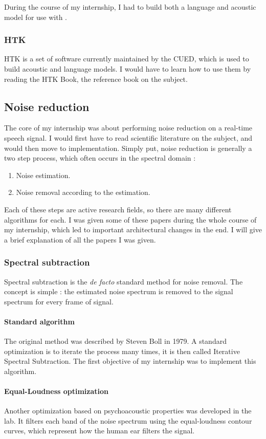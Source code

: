 During the course of my internship, I had to build both a language and acoustic model for use with .

\subsubsection{\ac{HTK}}
\ac{HTK} is a set of software currently maintained by the \ac{CUED}, which is used to build acoustic and language models. I would have to learn how to use them by reading the HTK Book, the reference book on the subject.

\subsection{Noise reduction}
The core of my internship was about performing noise reduction on a real-time speech signal.
I would first have to read scientific literature on the subject, and would then move to implementation.
Simply put, noise reduction is generally a two step process, which often occurs in the spectral domain : 
\begin{enumerate}
\item Noise estimation.
\item Noise removal according to the estimation.
\end{enumerate}

Each of these steps are active research fields, so there are many different algorithms for each. I was given some of these papers during the whole course of my internship, which led to important architectural changes in the end. I will give a brief explanation of all the papers I was given.
\subsubsection{Spectral subtraction}
Spectral subtraction is the \textit{de facto} standard method for noise removal. The concept is simple : the estimated noise spectrum is removed to the signal spectrum for every frame of signal.

\paragraph{Standard algorithm}
The original method was described by Steven Boll in 1979\cite{boll1979suppression}. A standard optimization is to iterate the process many times, it is then called Iterative Spectral Subtraction. The first objective of my internship was to implement this algorithm.
\paragraph{Equal-Loudness optimization}
Another optimization based on psychoacoustic properties was developed in the lab\cite{horii2013musical}. It filters each band of the noise spectrum using the equal-loudness contour curves, which represent how the human ear filters the signal.
